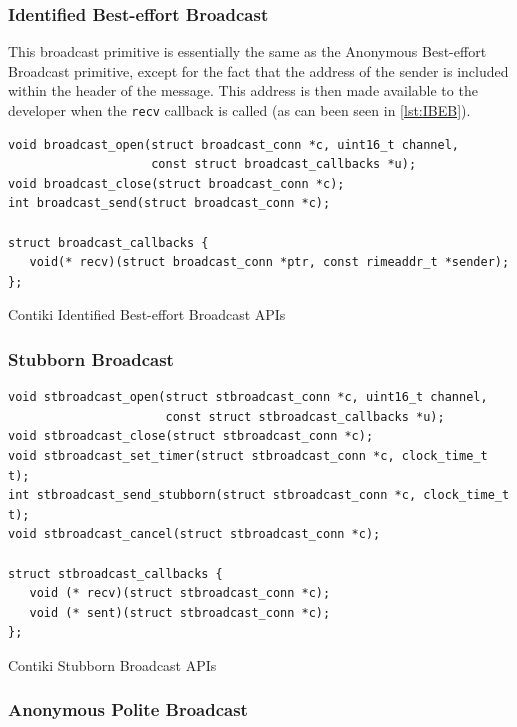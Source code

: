 \subsubsection{Identified Best-effort Broadcast}

This broadcast primitive is essentially the same as the Anonymous Best-effort Broadcast primitive, except for the fact that the address of the sender is included within the header of the message. This address is then made available to the developer when the \verb|recv| callback is called (as can been seen in \autoref{lst:IBEB}).

\begin{listing}[H]
\begin{verbatim}
void broadcast_open(struct broadcast_conn *c, uint16_t channel,
                    const struct broadcast_callbacks *u);
void broadcast_close(struct broadcast_conn *c);
int broadcast_send(struct broadcast_conn *c);

struct broadcast_callbacks {
   void(* recv)(struct broadcast_conn *ptr, const rimeaddr_t *sender);
};
\end{verbatim}
\caption{Contiki Identified Best-effort Broadcast APIs}
\label{lst:IBEB}
\end{listing}


\subsubsection{Stubborn Broadcast}

\begin{listing}[H]
\begin{verbatim}
void stbroadcast_open(struct stbroadcast_conn *c, uint16_t channel,
                      const struct stbroadcast_callbacks *u);
void stbroadcast_close(struct stbroadcast_conn *c);
void stbroadcast_set_timer(struct stbroadcast_conn *c, clock_time_t t);
int stbroadcast_send_stubborn(struct stbroadcast_conn *c, clock_time_t t);
void stbroadcast_cancel(struct stbroadcast_conn *c);

struct stbroadcast_callbacks {
   void (* recv)(struct stbroadcast_conn *c);
   void (* sent)(struct stbroadcast_conn *c);
};
\end{verbatim}
\caption{Contiki Stubborn Broadcast APIs}
\end{listing}

\subsubsection{Anonymous Polite Broadcast}

